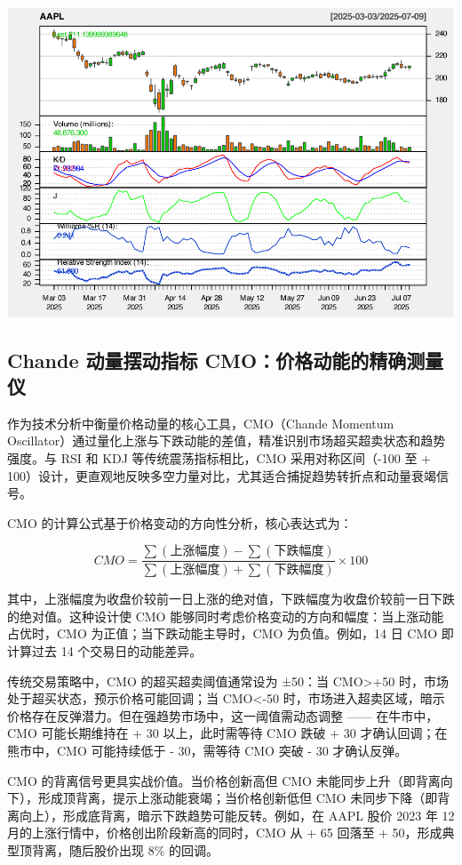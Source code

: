 \documentclass[]{ctexbook}
\begin{document}
\includegraphics[width=0.9\linewidth]{quantmod_files/figure-latex/wpr_2-6}

\subsection{Chande 动量摆动指标 CMO：价格动能的精确测量仪}\label{chande-ux52a8ux91cfux6446ux52a8ux6307ux6807-cmoux4ef7ux683cux52a8ux80fdux7684ux7cbeux786eux6d4bux91cfux4eea}

作为技术分析中衡量价格动量的核心工具，CMO（Chande Momentum Oscillator）通过量化上涨与下跌动能的差值，精准识别市场超买超卖状态和趋势强度。与 RSI 和 KDJ 等传统震荡指标相比，CMO 采用对称区间（-100 至 + 100）设计，更直观地反映多空力量对比，尤其适合捕捉趋势转折点和动量衰竭信号。

CMO 的计算公式基于价格变动的方向性分析，核心表达式为：

\[ CMO = \frac{\sum(\text{上涨幅度}) - \sum(\text{下跌幅度})}{\sum(\text{上涨幅度}) + \sum(\text{下跌幅度})} \times 100\]

其中，上涨幅度为收盘价较前一日上涨的绝对值，下跌幅度为收盘价较前一日下跌的绝对值。这种设计使 CMO 能够同时考虑价格变动的方向和幅度：当上涨动能占优时，CMO 为正值；当下跌动能主导时，CMO 为负值。例如，14 日 CMO 即计算过去 14 个交易日的动能差异。

传统交易策略中，CMO 的超买超卖阈值通常设为 ±50：当 CMO\textgreater+50 时，市场处于超买状态，预示价格可能回调；当 CMO\textless-50 时，市场进入超卖区域，暗示价格存在反弹潜力。但在强趋势市场中，这一阈值需动态调整 ------ 在牛市中，CMO 可能长期维持在 + 30 以上，此时需等待 CMO 跌破 + 30 才确认回调；在熊市中，CMO 可能持续低于 - 30，需等待 CMO 突破 - 30 才确认反弹。

CMO 的背离信号更具实战价值。当价格创新高但 CMO 未能同步上升（即背离向下），形成顶背离，提示上涨动能衰竭；当价格创新低但 CMO 未同步下降（即背离向上），形成底背离，暗示下跌趋势可能反转。例如，在 AAPL 股价 2023 年 12 月的上涨行情中，价格创出阶段新高的同时，CMO 从 + 65 回落至 + 50，形成典型顶背离，随后股价出现 8\% 的回调。
\end{document}
